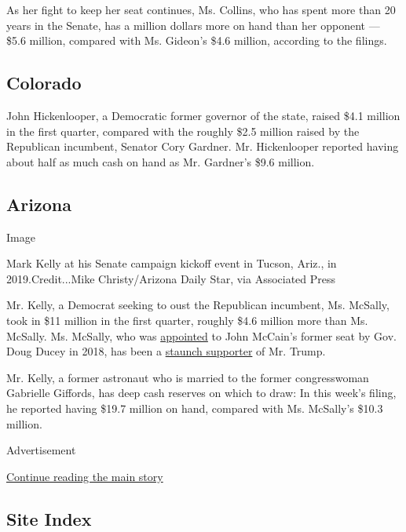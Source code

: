 As her fight to keep her seat continues, Ms. Collins, who has spent more
than 20 years in the Senate, has a million dollars more on hand than her
opponent --- \$5.6 million, compared with Ms. Gideon's \$4.6 million,
according to the filings.

\hypertarget{colorado}{%
\subsection{Colorado}\label{colorado}}

John Hickenlooper, a Democratic former governor of the state, raised
\$4.1 million in the first quarter, compared with the roughly \$2.5
million raised by the Republican incumbent, Senator Cory Gardner. Mr.
Hickenlooper reported having about half as much cash on hand as Mr.
Gardner's \$9.6 million.

\hypertarget{arizona}{%
\subsection{Arizona}\label{arizona}}

Image

Mark Kelly at his Senate campaign kickoff event in Tucson, Ariz., in
2019.Credit...Mike Christy/Arizona Daily Star, via Associated Press

Mr. Kelly, a Democrat seeking to oust the Republican incumbent, Ms.
McSally, took in \$11 million in the first quarter, roughly \$4.6
million more than Ms. McSally. Ms. McSally, who was
\href{https://www.nytimes3xbfgragh.onion/2018/12/18/us/politics/martha-mcsally-senate-mccain-kyl.html}{appointed}
to John McCain's former seat by Gov. Doug Ducey in 2018, has been a
\href{https://www.nytimes3xbfgragh.onion/2020/01/31/us/trump-impeachment-senate-republicans.html}{staunch
supporter} of Mr. Trump.

Mr. Kelly, a former astronaut who is married to the former congresswoman
Gabrielle Giffords, has deep cash reserves on which to draw: In this
week's filing, he reported having \$19.7 million on hand, compared with
Ms. McSally's \$10.3 million.

Advertisement

\protect\hyperlink{after-bottom}{Continue reading the main story}

\hypertarget{site-index}{%
\subsection{Site Index}\label{site-index}}

